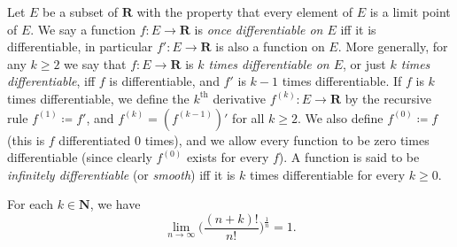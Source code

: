\begin{definition}\label{4.2.4}
    Let \(E\) be a subset of \(\mathbf{R}\) with the property that every element of \(E\) is a limit point of \(E\).
    We say a function \(f : E \to \mathbf{R}\) is \emph{once differentiable on \(E\)} iff it is differentiable, in particular \(f': E \to \mathbf{R}\) is also a function on \(E\).
    More generally, for any \(k \geq 2\) we say that \(f : E \to \mathbf{R}\) is \emph{\(k\) times differentiable on \(E\)}, or just \emph{\(k\) times differentiable}, iff \(f\) is differentiable, and \(f'\) is \(k - 1\) times differentiable.
    If \(f\) is \(k\) times differentiable, we define the \(k^{\text{th}}\) derivative \(f^{(k)} : E \to \mathbf{R}\) by the recursive rule \(f^{(1)} \coloneqq f'\), and \(f^{(k)} = (f^{(k - 1)})'\) for all \(k \geq 2\).
    We also define \(f^{(0)} \coloneqq f\) (this is \(f\) differentiated \(0\) times), and we allow every function to be zero times differentiable (since clearly \(f^{(0)}\) exists for every \(f\)).
    A function is said to be \emph{infinitely differentiable} (or \emph{smooth}) iff it is \(k\) times differentiable for every \(k \geq 0\).
\end{definition}

\begin{additional corollary}\label{ac 4.2.1}
For each \(k \in \mathbf{N}\), we have
\[
    \lim_{n \to \infty} \bigg(\frac{(n + k)!}{n!}\bigg)^{\frac{1}{n}} = 1.
\]
\end{additional corollary}

